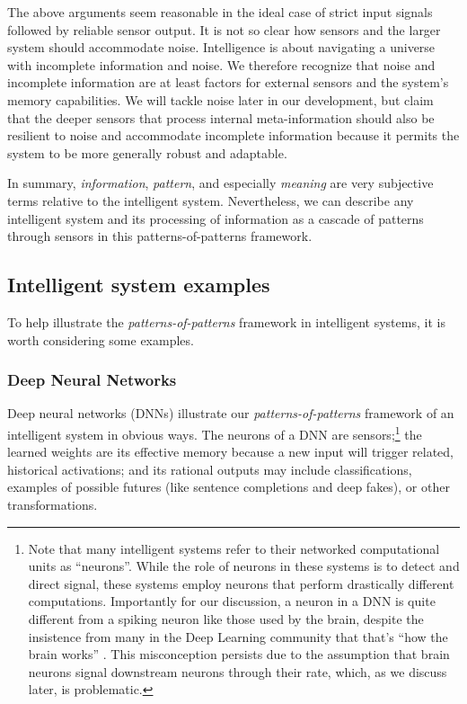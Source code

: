 The above arguments seem reasonable in the ideal case of strict input signals followed by reliable sensor output.
It is not so clear how sensors and the larger system should accommodate noise.
Intelligence is about navigating a universe with incomplete information and noise.
We therefore recognize that noise and incomplete information are at least factors for external sensors and the system's memory capabilities.
We will tackle noise later in our development, but claim that the deeper sensors that process internal meta-information should also be resilient to noise and accommodate incomplete information because it permits the system to be more generally robust and adaptable.

In summary, \emph{information}, \emph{pattern}, and especially \emph{meaning} are very subjective terms relative to the intelligent system.
Nevertheless, we can describe any intelligent system and its processing of information as a cascade of patterns through sensors in this patterns-of-patterns framework.

\subsection{Intelligent system examples}

To help illustrate the \emph{patterns-of-patterns} framework in intelligent systems, it is worth considering some examples.

\subsubsection{Deep Neural Networks}

Deep neural networks (DNNs) illustrate our \emph{patterns-of-patterns} framework of an intelligent system in obvious ways.
The neurons of a DNN are sensors;\footnote{Note that many intelligent systems refer to their networked computational units as ``neurons''. While the role of neurons in these systems is to detect and direct signal, these systems employ neurons that perform drastically different computations. Importantly for our discussion, a neuron in a DNN is quite different from a spiking neuron like those used by the brain, despite the insistence from many in the Deep Learning community that that's ``how the brain works'' \cite{Believers2015, NeuralNetworksDeep}. This misconception persists due to the assumption that brain neurons signal downstream neurons through their rate, which, as we discuss later, is problematic.} the learned weights are its effective memory because a new input will trigger related, historical activations; and its rational outputs may include classifications, examples of possible futures (like sentence completions and deep fakes), or other transformations.

